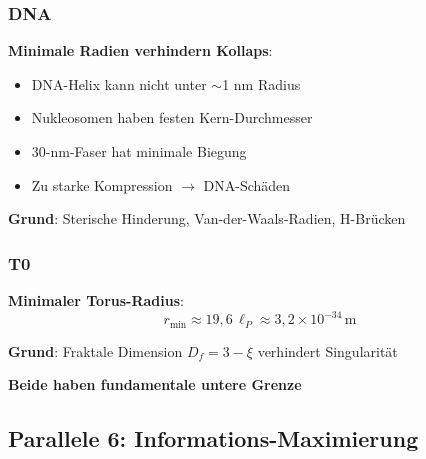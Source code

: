 	\subsubsection{DNA}

	\textbf{Minimale Radien verhindern Kollaps}:

	\begin{itemize}
		\item DNA-Helix kann nicht unter $\sim$1 nm Radius
		\item Nukleosomen haben festen Kern-Durchmesser
		\item 30-nm-Faser hat minimale Biegung
		\item Zu starke Kompression $\to$ DNA-Schäden
	\end{itemize}

	\textbf{Grund}: Sterische Hinderung, Van-der-Waals-Radien, H-Brücken

	\subsubsection{T0}

	\textbf{Minimaler Torus-Radius}:
	\begin{equation}
		r_{\min} \approx 19{,}6\,\ell_P \approx 3{,}2 \times 10^{-34}\,\text{m}
	\end{equation}

	\textbf{Grund}: Fraktale Dimension $D_f = 3-\xi$ verhindert Singularität

	\begin{keyresult}
		\textbf{Beide haben fundamentale untere Grenze}

		\begin{table}[H]
			\centering
		\end{table}
	\end{keyresult}

	\subsection{Parallele 6: Informations-Maximierung}

